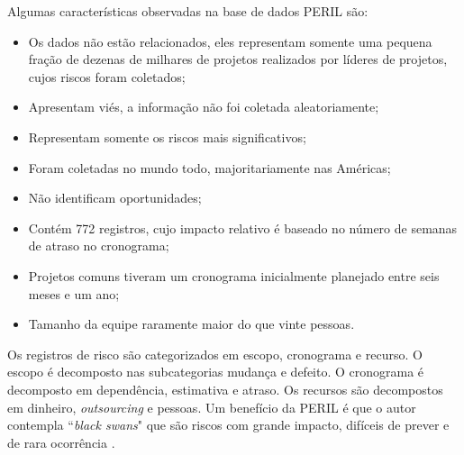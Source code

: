 Algumas características observadas na base de dados PERIL são:
\begin{itemize}
\item Os dados não estão relacionados, eles representam somente uma pequena fração de dezenas de milhares de projetos realizados por líderes de projetos, cujos riscos foram coletados;
\item Apresentam viés, a informação não foi coletada aleatoriamente;
\item Representam somente os riscos mais significativos;
\item Foram coletadas no mundo todo, majoritariamente nas Américas;
\item Não identificam oportunidades; 
\item Contém 772 registros, cujo impacto relativo é baseado no número de semanas de atraso no cronograma;
\item Projetos comuns tiveram um cronograma inicialmente planejado entre seis meses e um ano;
\item Tamanho da equipe raramente maior do que vinte pessoas.
\end{itemize}

Os registros de risco são categorizados em escopo, cronograma e recurso. O escopo é decomposto nas subcategorias mudança e defeito. O cronograma é decomposto em dependência, estimativa e atraso. Os recursos são decompostos em dinheiro, \textit{outsourcing} e pessoas. Um benefício da PERIL é que o autor contempla ``\textit{black swans}" que são riscos com grande impacto, difíceis de prever e de rara ocorrência \cite{taleb2001fooled}.

